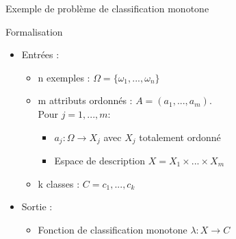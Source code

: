 \documentclass[usenames,dvipsnames]{beamer}
\begin{document}
\begin{frame}{Exemple de problème de classification monotone}
\textcite{potharst-classification-bank}

\begin{table}
\label{tab:bank-loan-dataset}
\end{table}

\end{frame}

\begin{frame}{Formalisation}

\begin{itemize}
\item Entrées :  
\begin{itemize}
	\item n exemples : $\Omega = \{\omega_1, ... , \omega_n\}$
    \item m attributs ordonnés : $A = (a_1, ... , a_m)$. \\ Pour $j=1,... ,m :$
    	\begin{itemize}
    	\item $a_j : \Omega \rightarrow X_j$ avec $X_j$ totalement ordonné
        \item Espace de description $X = X_1 \times ... \times X_m$
    	\end{itemize}
    \item k classes : $C = {c_1, ... , c_k}$
\end{itemize}
\item Sortie : 
\begin{itemize}
\item Fonction de classification monotone $\lambda : X \rightarrow C$
\end{itemize}
\end{itemize}

\end{frame}
\end{document}

